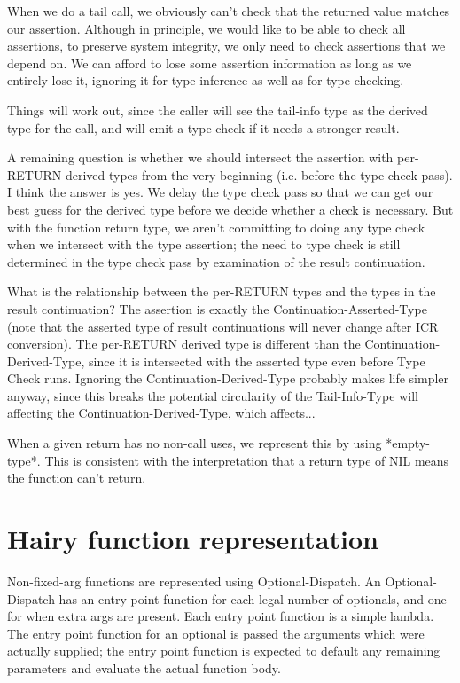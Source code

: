 When we do a tail call, we obviously can't check that the returned value
matches our assertion.  Although in principle, we would like to be able to
check all assertions, to preserve system integrity, we only need to check
assertions that we depend on.  We can afford to lose some assertion information
as long as we entirely lose it, ignoring it for type inference as well as for
type checking.

Things will work out, since the caller will see the tail-info type as the
derived type for the call, and will emit a type check if it needs a stronger
result.

A remaining question is whether we should intersect the assertion with
per-RETURN derived types from the very beginning (i.e. before the type check
pass).  I think the answer is yes.  We delay the type check pass so that we can
get our best guess for the derived type before we decide whether a check is
necessary.  But with the function return type, we aren't committing to doing
any type check when we intersect with the type assertion; the need to type
check is still determined in the type check pass by examination of the result
continuation.

What is the relationship between the per-RETURN types and the types in the
result continuation?  The assertion is exactly the Continuation-Asserted-Type
(note that the asserted type of result continuations will never change after
ICR conversion).  The per-RETURN derived type is different than the
Continuation-Derived-Type, since it is intersected with the asserted type even
before Type Check runs.  Ignoring the Continuation-Derived-Type probably makes
life simpler anyway, since this breaks the potential circularity of the
Tail-Info-Type will affecting the Continuation-Derived-Type, which affects...

When a given return has no non-call uses, we represent this by using
*empty-type*.  This is consistent with the interpretation that a return type of
NIL means the function can't return.

\section{Hairy function representation}

Non-fixed-arg functions are represented using Optional-Dispatch.  An
Optional-Dispatch has an entry-point function for each legal number of
optionals, and one for when extra args are present.  Each entry point function
is a simple lambda.  The entry point function for an optional is passed the
arguments which were actually supplied; the entry point function is expected to
default any remaining parameters and evaluate the actual function body.

